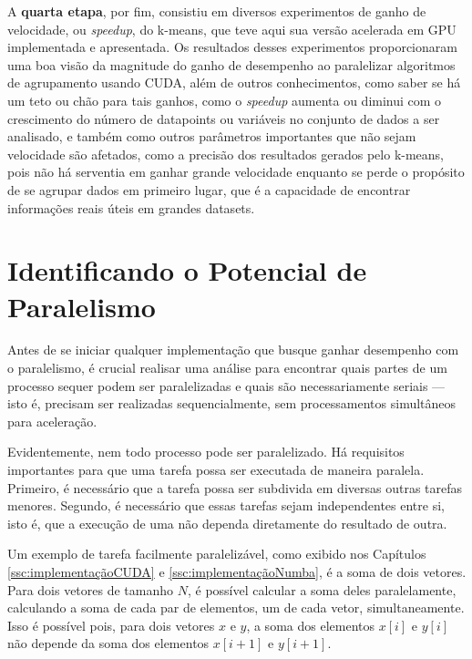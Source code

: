 \documentclass[12pt,
openright, 
oneside, %
a4paper,    %
brazil]{facom-ufu-abntex2}
\begin{document}
A \textbf{quarta etapa}, por fim, consistiu em diversos experimentos de ganho de velocidade, ou \textit{speedup}, do k-means, que teve aqui sua versão acelerada em GPU implementada e apresentada. Os resultados desses experimentos proporcionaram uma boa visão da magnitude do ganho de desempenho ao paralelizar algoritmos de agrupamento usando CUDA, além de outros conhecimentos, como saber se há um teto ou chão para tais ganhos, como o \textit{speedup} aumenta ou diminui com o crescimento do número de datapoints ou variáveis no conjunto de dados a ser analisado, e também como outros parâmetros importantes que não sejam velocidade são afetados, como a precisão dos resultados gerados pelo k-means, pois não há serventia em ganhar grande velocidade enquanto se perde o propósito de se agrupar dados em primeiro lugar, que é a capacidade de encontrar informações reais úteis em grandes datasets.




\section{Identificando o Potencial de Paralelismo}
\label{chp:identifPotencParalel}

Antes de se iniciar qualquer implementação que busque ganhar desempenho com o paralelismo, é crucial realisar uma análise para encontrar quais partes de um processo sequer podem ser paralelizadas e quais são necessariamente seriais --- isto é, precisam ser realizadas sequencialmente, sem processamentos simultâneos para aceleração.

Evidentemente, nem todo processo pode ser paralelizado. Há requisitos importantes para que uma tarefa possa ser executada de maneira paralela. Primeiro, é necessário que a tarefa possa ser subdivida em diversas outras tarefas menores. Segundo, é necessário que essas tarefas sejam independentes entre si, isto é, que a execução de uma não dependa diretamente do resultado de outra.

Um exemplo de tarefa facilmente paralelizável, como exibido nos Capítulos \ref*{ssc:implementaçãoCUDA} e \ref*{ssc:implementaçãoNumba}, é a soma de dois vetores. Para dois vetores de tamanho $N$, é possível calcular a soma deles paralelamente, calculando a soma de cada par de elementos, um de cada vetor, simultaneamente. Isso é possível pois, para dois vetores $x$ e $y$, a soma dos elementos $x[i]$ e $y[i]$ não depende da soma dos elementos $x[i+1]$ e $y[i+1]$.
\end{document}
